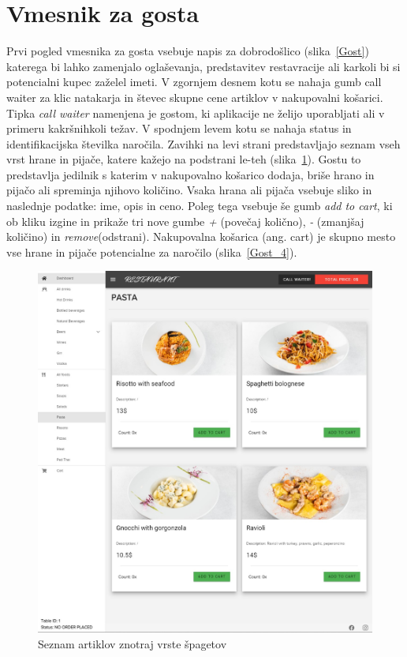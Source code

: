 \documentclass[a4paper, 12pt]{book}
\begin{document}
\section{Vmesnik za gosta}
Prvi pogled vmesnika za gosta vsebuje napis za dobrodošlico (slika~\ref{Gost}) katerega bi lahko zamenjalo oglaševanja, predstavitev restavracije ali karkoli bi si potencialni kupec zaželel imeti. V zgornjem desnem kotu se nahaja gumb call waiter za klic natakarja in števec skupne cene artiklov v nakupovalni košarici. Tipka \textit{call waiter} namenjena je gostom, ki aplikacije ne želijo uporabljati ali v primeru kakršnihkoli težav. V spodnjem levem kotu se nahaja status in identifikacijska številka naročila. Zavihki na levi strani predstavljajo seznam vseh vrst hrane in pijače, katere kažejo na podstrani le-teh (slika~\ref{Gost_3}). Gostu to predstavlja jedilnik s katerim v nakupovalno košarico dodaja, briše hrano in pijačo ali spreminja njihovo količino. Vsaka hrana ali pijača vsebuje sliko in naslednje podatke: ime, opis in ceno. Poleg tega vsebuje še gumb \textit{add to cart}, ki ob kliku izgine in prikaže tri nove gumbe \textit{+} (povečaj količno), \textit{-} (zmanjšaj količino) in \textit{remove}(odstrani). Nakupovalna košarica (ang. cart) je skupno mesto vse hrane in pijače potencialne za naročilo (slika~\ref{Gost_4}).
\begin{figure}[!htb]
\begin{center}
\includegraphics[width=11.5cm]{gost_3.jpg}
\caption{Seznam artiklov znotraj vrste špagetov}
\label{Gost_3}
\end{center}
\end{figure}
\end{document}
